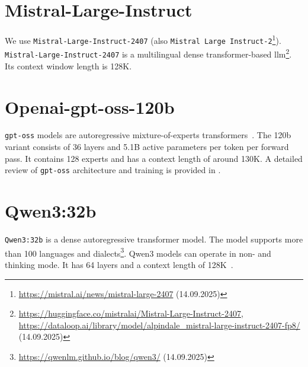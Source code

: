 

\section{Mistral-Large-Instruct}

We use \texttt{Mistral-Large-Instruct-2407} (also \texttt{Mistral Large Instruct-2}\footnote{\url{https://mistral.ai/news/mistral-large-2407} (14.09.2025)}).
\texttt{Mistral-Large-Instruct-2407} is a multilingual dense transformer-based \ac{llm}\footnote{\url{https://huggingface.co/mistralai/Mistral-Large-Instruct-2407}, \url{https://dataloop.ai/library/model/alpindale_mistral-large-instruct-2407-fp8/} (14.09.2025)}.
Its context window length is 128K.

\section{Openai-gpt-oss-120b}

\texttt{gpt-oss} models are autoregressive mixture-of-experts transformers~\citep{openai2025gptoss120bgptoss20bmodel}.
The 120b variant consists of 36 layers and 5.1B active parameters per token per forward pass.
It contains 128 experts and has a context length of around 130K.
A detailed review of \texttt{gpt-oss} architecture and training is provided in \citep{openai2025gptoss120bgptoss20bmodel}.


\section{Qwen3:32b}
\texttt{Qwen3:32b} is a dense autoregressive transformer model.
The model supports more than 100 languages and dialects\footnote{\url{https://qwenlm.github.io/blog/qwen3/} (14.09.2025)}.
Qwen3 models can operate in non- and thinking mode.
It has 64 layers and a context length of 128K~\citep{qwen3_technical_report}.